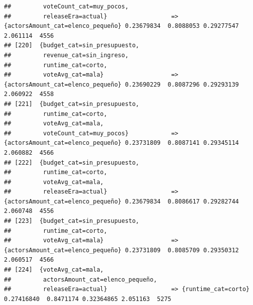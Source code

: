 \documentclass[
]{article}
\begin{document}
\begin{verbatim}
##         voteCount_cat=muy_pocos,                                                                                                
##         releaseEra=actual}                  => {actorsAmount_cat=elenco_pequeño} 0.23679834  0.8088053 0.29277547 2.061114  4556
## [220]  {budget_cat=sin_presupuesto,                                                                                             
##         revenue_cat=sin_ingreso,                                                                                                
##         runtime_cat=corto,                                                                                                      
##         voteAvg_cat=mala}                   => {actorsAmount_cat=elenco_pequeño} 0.23690229  0.8087296 0.29293139 2.060922  4558
## [221]  {budget_cat=sin_presupuesto,                                                                                             
##         runtime_cat=corto,                                                                                                      
##         voteAvg_cat=mala,                                                                                                       
##         voteCount_cat=muy_pocos}            => {actorsAmount_cat=elenco_pequeño} 0.23731809  0.8087141 0.29345114 2.060882  4566
## [222]  {budget_cat=sin_presupuesto,                                                                                             
##         runtime_cat=corto,                                                                                                      
##         voteAvg_cat=mala,                                                                                                       
##         releaseEra=actual}                  => {actorsAmount_cat=elenco_pequeño} 0.23679834  0.8086617 0.29282744 2.060748  4556
## [223]  {budget_cat=sin_presupuesto,                                                                                             
##         runtime_cat=corto,                                                                                                      
##         voteAvg_cat=mala}                   => {actorsAmount_cat=elenco_pequeño} 0.23731809  0.8085709 0.29350312 2.060517  4566
## [224]  {voteAvg_cat=mala,                                                                                                       
##         actorsAmount_cat=elenco_pequeño,                                                                                        
##         releaseEra=actual}                  => {runtime_cat=corto}               0.27416840  0.8471174 0.32364865 2.051163  5275

\end{verbatim}
\end{document}
